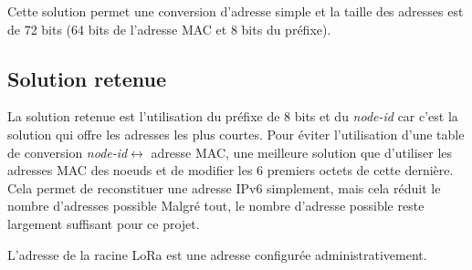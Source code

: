     Cette solution permet une conversion d'adresse simple et la taille des adresses est de 72 bits (64 bits de l'adresse MAC et 8 bits du préfixe).

\subsection*{Solution retenue}
    La solution retenue est l'utilisation du préfixe de 8 bits et du \textit{node-id} car c'est la solution qui offre les adresses les plus courtes. Pour éviter l'utilisation d'une table de conversion \textit{node-id}$\leftrightarrow$ adresse MAC, une meilleure solution que d'utiliser les adresses MAC des noeuds et de modifier les 6 premiers octets de cette dernière. Cela permet de reconstituer une adresse IPv6 simplement, mais cela réduit le nombre d'adresses possible
    Malgré tout, le nombre d'adresse possible reste largement suffisant pour ce projet.

    L'adresse de la racine LoRa est une adresse configurée administrativement.

